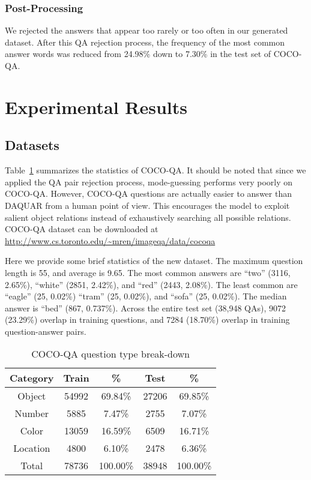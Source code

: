 \documentclass{article} \usepackage{nips15submit_e,times}
\renewcommand{\#}[1]{\textbf{#1}}
\begin{document}
\subsubsection{Post-Processing}
We rejected the answers that appear too rarely or too often in our generated
dataset. After this QA rejection process, the frequency of the most common answer 
words was reduced from 24.98\% down to 7.30\% in the test set of COCO-QA.

\section{Experimental Results}
\subsection{Datasets}
Table~\ref{tab:dataset_category_stats} summarizes the statistics of COCO-QA. It
should be noted that since we applied the QA pair rejection process,
mode-guessing performs very poorly on COCO-QA. However, COCO-QA questions are
actually easier to answer than DAQUAR from a human point of view. This
encourages the model to exploit salient object relations instead of
exhaustively searching all possible relations. COCO-QA dataset can be
downloaded at \url{http://www.cs.toronto.edu/~mren/imageqa/data/cocoqa}

Here we provide some brief statistics of the new dataset. The maximum question
length is 55, and average is 9.65.  The most common answers are ``two'' (3116,
2.65\%), ``white'' (2851, 2.42\%), and ``red'' (2443, 2.08\%). The least common
are ``eagle'' (25, 0.02\%) ``tram'' (25, 0.02\%), and ``sofa'' (25, 0.02\%).
The median answer is ``bed'' (867, 0.737\%).  Across the entire test set (38,948
QAs), 9072 (23.29\%) overlap in training questions, and 7284 (18.70\%) overlap
in training question-answer pairs.
\begin{table}
\caption{COCO-QA question type break-down}
\label{tab:dataset_category_stats}
\vskip 0.15in
\begin{center}
\begin{small}
\begin{sc}
\begin{tabular}{c c c c c}
\hline
Category & Train & \%       & Test  & \%       \\
\hline
Object   & 54992 & 69.84\%  & 27206 & 69.85\%  \\
Number   & 5885  & 7.47\%   & 2755  & 7.07\%   \\
Color    & 13059 & 16.59\%  & 6509  & 16.71\%  \\
Location & 4800  & 6.10\%   & 2478  & 6.36\%   \\
\hline
Total    & 78736 & 100.00\% & 38948 & 100.00\% \\
\hline
\end{tabular}
\end{sc}
\end{small}
\end{center}
\end{table}
\end{document}
